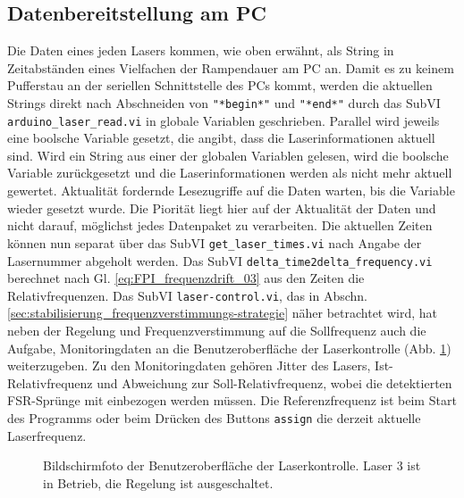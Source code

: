 \subsection{Datenbereitstellung am PC}\label{subsec:datenbereitstellung}
Die Daten eines jeden Lasers kommen, wie oben erwähnt, als String in
Zeitabständen eines Vielfachen der Rampendauer am PC an. Damit es zu keinem Pufferstau an
der seriellen Schnittstelle des PCs kommt, werden die aktuellen Strings direkt
nach Abschneiden von \lstinline|"*begin*"| und \lstinline|"*end*"| durch das
SubVI \lstinline|arduino_laser_read.vi| in globale Variablen geschrieben.
Parallel wird jeweils eine boolsche Variable gesetzt, die angibt, dass die Laserinformationen aktuell sind. Wird ein String aus einer der
globalen Variablen gelesen, wird die boolsche Variable zurückgesetzt und die
Laserinformationen werden als nicht mehr aktuell gewertet. Aktualität fordernde
Lesezugriffe auf die Daten warten, bis die Variable wieder gesetzt wurde. Die
Piorität liegt hier auf der Aktualität der Daten und nicht darauf, möglichst
jedes Datenpaket zu verarbeiten. Die aktuellen Zeiten können nun separat über
das SubVI \lstinline|get_laser_times.vi| nach Angabe der Lasernummer abgeholt werden. Das SubVI \lstinline|delta_time2delta_frequency.vi| berechnet nach Gl. \eqref{eq:FPI_frequenzdrift_03} aus den Zeiten die Relativfrequenzen. Das SubVI \lstinline|laser-control.vi|, das in Abschn.
\ref{sec:stabilisierung_frequenzverstimmungs-strategie} näher betrachtet wird,
hat neben der Regelung und Frequenzverstimmung auf die Sollfrequenz auch die Aufgabe, Monitoringdaten an die Benutzeroberfläche der Laserkontrolle (Abb.
\ref{fig:benutzeroberflaeche_laserkontrolle}) weiterzugeben. Zu den
Monitoringdaten gehören Jitter des Lasers, Ist-Relativfrequenz und Abweichung
zur Soll-Relativfrequenz, wobei die detektierten FSR-Sprünge mit einbezogen
werden müssen. Die Referenzfrequenz ist beim Start des Programms oder beim
Drücken des Buttons \lstinline|assign| die derzeit aktuelle Laserfrequenz.
\begin{figure}[h]
 	\centering
	\caption[Benutzeroberfläche -
	Laserkontrolle]{Bildschirmfoto der Benutzeroberfläche der Laserkontrolle. Laser
	3 ist in Betrieb, die Regelung ist ausgeschaltet.}
	\label{fig:benutzeroberflaeche_laserkontrolle}
\end{figure}

